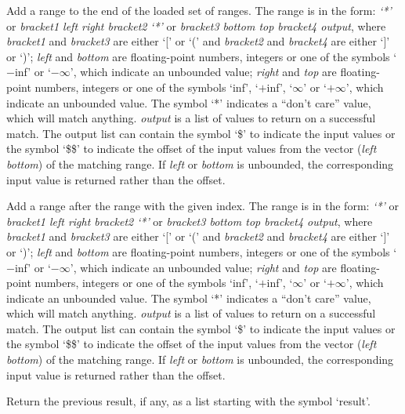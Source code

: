   Add a range to the end of the loaded set of ranges.
  The range is in the form: \emph{`*'} or \emph{bracket1 left right bracket2} \emph{`*'} or \emph{bracket3 bottom top bracket4 output}, where
  \emph{bracket1} and \emph{bracket3} are either `[' or `(' and \emph{bracket2} and \emph{bracket4} are
  either `]' or `)';
  \emph{left} and \emph{bottom} are floating-point numbers, integers or one of the symbols `$-$inf' or
  `$-\infty$', which indicate an unbounded value;
  \emph{right} and \emph{top} are floating-point numbers, integers or one of the symbols `inf', `$+$inf',
  `$\infty$' or `$+\infty$', which indicate an unbounded value.
  The symbol `*' indicates a ``don't care'' value, which will match anything.
  \emph{output} is a list of values to return on a successful match.
  The output list can contain the symbol `\$' to indicate the input values or the symbol `\$\$' to
  indicate the offset of the input values from the vector (\emph{left} \emph{bottom}) of the matching range.
  If \emph{left} or \emph{bottom} is unbounded, the corresponding input value is returned rather than the offset.
  
  Add a range after the range with the given index.
  The range is in the form: \emph{`*'} or \emph{bracket1 left right bracket2} \emph{`*'} or \emph{bracket3 bottom top bracket4 output}, where
  \emph{bracket1} and \emph{bracket3} are either `[' or `(' and \emph{bracket2} and \emph{bracket4} are
  either `]' or `)';
  \emph{left} and \emph{bottom} are floating-point numbers, integers or one of the symbols `$-$inf' or
  `$-\infty$', which indicate an unbounded value;
  \emph{right} and \emph{top} are floating-point numbers, integers or one of the symbols `inf', `$+$inf',
  `$\infty$' or `$+\infty$', which indicate an unbounded value.
  The symbol `*' indicates a ``don't care'' value, which will match anything.
  \emph{output} is a list of values to return on a successful match.
  The output list can contain the symbol `\$' to indicate the input values or the symbol `\$\$' to
  indicate the offset of the input values from the vector (\emph{left} \emph{bottom}) of the matching range.
  If \emph{left} or \emph{bottom} is unbounded, the corresponding input value is returned rather than the offset.

  Return the previous result, if any, as a list starting with the symbol `result'.

